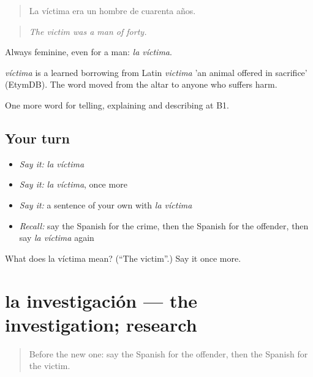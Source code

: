 \begin{quote}
La víctima era un hombre de cuarenta años.
\end{quote}

\begin{quote}
\emph{The victim was a man of forty.}
\end{quote}

Always feminine, even for a man: \emph{la víctima}.

\begin{cousinweb}
\emph{víctima} is a learned borrowing from Latin \emph{victima} 'an animal offered in sacrifice' (EtymDB). The word moved from the altar to anyone who suffers harm.
\end{cousinweb}

\begin{grammarlens}[title={What you've built}]
One more word for telling, explaining and describing at B1.
\end{grammarlens}

\subsection*{Your turn}
\begin{itemize}
\raggedright
  \item \emph{Say it:} \emph{la víctima}
  \item \emph{Say it:} \emph{la víctima}, once more
  \item \emph{Say it:} a sentence of your own with \emph{la víctima}
  \item \emph{Recall:} say the Spanish for the crime, then the Spanish for the offender, then say \emph{la víctima} again
\end{itemize}

\begin{tcolorbox}[breakable,colback=teal!4,colframe=teal!35!black,title={Before you move on}]
What does la víctima mean? (\textquotedblleft{}The victim\textquotedblright{}.) Say it once more.
\end{tcolorbox}
\section[la investigación]{la investigación — the investigation; research}

\label{lesson:ES-C520-investigacion}



\begin{quote}
Before the new one: say the Spanish for the offender, then the Spanish for the victim.
\end{quote}

